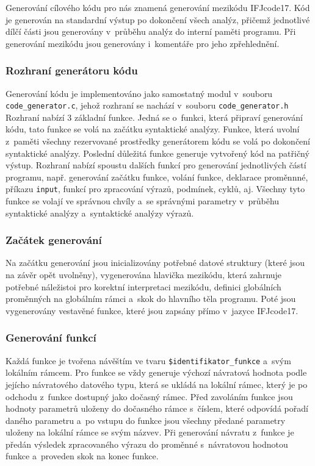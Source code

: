 \documentclass[a4paper, 11pt]{article}
\begin{document}
	Generování cílového kódu pro nás znamená generování mezikódu IFJcode17. Kód je generován na standardní výstup
	po dokončení všech analýz, přičemž jednotlivé dílčí části jsou generovány v~průběhu analýz do interní paměti
	programu. Při generování mezikódu jsou generovány i~komentáře pro jeho zpřehlednění.

	\subsubsection{Rozhraní generátoru kódu}

	Generování kódu je implementováno jako samostatný modul v~souboru \texttt{code\_generator.c},
	jehož rozhraní se nachází v~souboru \texttt{code\_generator.h} Rozhraní nabízí 3 základní funkce.
	Jedná se o~funkci, která připraví generování kódu, tato funkce se volá na začátku syntaktické analýzy.
	Funkce, která uvolní z~paměti všechny rezervované prostředky generátorem kódu se volá po dokončení
	syntaktické analýzy. Poslední důležitá funkce generuje vytvořený kód na patřičný výstup. Rozhraní
	nabízí spoustu dalších funkcí pro generování jednotlivých částí programu, např. generování začátku
	funkce, volání funkce, deklarace proměnnné, příkazu \texttt{input}, funkcí pro zpracování výrazů,
	podmínek, cyklů, aj. Všechny tyto funkce se volají ve správnou chvíly a~se správnými
	parametry v~průběhu syntaktické analýzy a~syntaktické analýzy výrazů.

	\subsubsection{Začátek generování}

	Na začátku generování jsou inicializovány potřebné datové struktury (které jsou na závěr
	opět uvolněny), vygenerována hlavička mezikódu, která zahrnuje potřebné náležistoi pro korektní
	interpretaci mezikódu, definici globálních proměnných na globálním rámci a~skok do hlavního
	těla programu. Poté jsou vygenerovány vestavěné funkce, které jsou zapsány přímo v~jazyce IFJcode17.

	\subsubsection{Generování funkcí}

	Každá funkce je tvořena návěštím ve tvaru \texttt{\$identifikator\_funkce} a~svým lokálním rámcem.
	Pro funkce se vždy generuje výchozí návratová hodnota podle jejícho návratového datového typu,
	která se ukládá na lokální rámec, který je po odchodu z~funkce dostupný jako dočasný rámec.
	Před zavoláním funkce jsou hodnoty parametrů uloženy do dočasného rámce s~číslem, které
	odpovídá pořadí daného parametru a~po vstupu do funkce jsou všechny předané parametry uloženy na
	lokální rámce se svým názvev. Při generování návratu z~funkce je předán výsledek zpracovaného
	výrazu do proměnné s~návratovou hodnotou funkce a~proveden skok na konec funkce.
\end{document}
